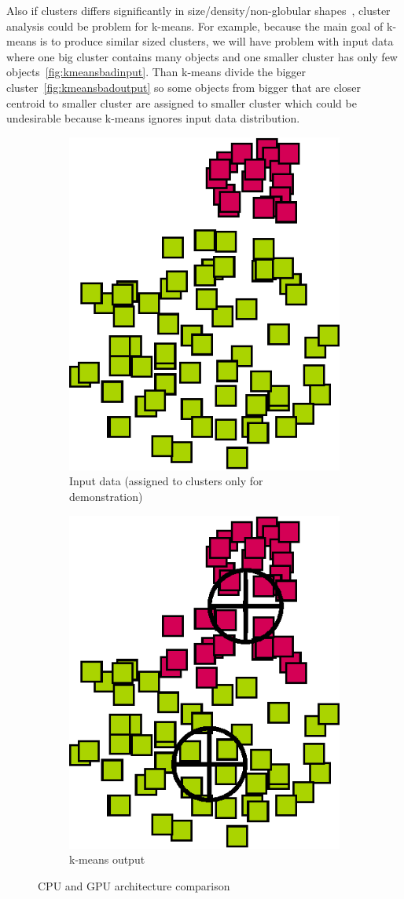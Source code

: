 Also if clusters differs significantly in size/density/non-globular shapes~\cite{Tan05}, cluster analysis could be problem for k-means. For example, because the main goal of k-means is to produce similar sized clusters, we will have problem with input data where one big cluster contains many objects and one smaller cluster has only few objects~\autoref{fig:kmeansbadinput}. Than k-means divide the bigger cluster~\autoref{fig:kmeansbadoutput} so some objects from bigger that are closer centroid to smaller cluster are assigned to smaller cluster which could be undesirable because k-means ignores input data distribution. %
\begin{figure}[h]
\centering
\begin{subfigure}{.49\textwidth}
  \centering
  \includegraphics[width=.5\linewidth]{img/kmeans_badsample1.eps}
  \caption{Input data (assigned to clusters only for demonstration)}
  \label{fig:kmeansbadinput}
\end{subfigure}
\begin{subfigure}{.49\textwidth}
  \centering
  \includegraphics[width=.5\linewidth]{img/kmeans_badsample2.eps}
  \caption{k-means output}
  \label{fig:kmeansbadoutput}
\end{subfigure}
\caption{CPU and GPU architecture comparison}
\end{figure}

